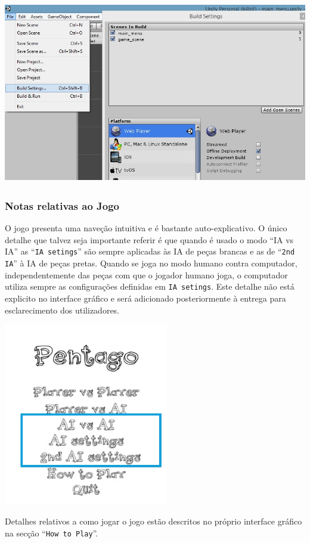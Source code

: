 \begin{table}[H]
\centering
\includegraphics[height=8cm]{user_manual/unitybuild.jpg}
\end{table}

\newpage
\subsubsection{Notas relativas ao Jogo}

O jogo presenta uma naveç\~ao intuitiva e é bastante auto-explicativo. O único detalhe que talvez seja importante referir é que quando é usado o modo ``IA vs IA'' as ``\verb|IA setings|'' são sempre aplicadas às IA de peças brancas e as de ``\verb|2nd IA|'' à IA de peças pretas. Quando se joga no modo humano contra computador, independentemente das peças com que o jogador humano joga, o computador utiliza sempre as configurações definidas em \verb|IA setings|. Este detalhe n\~ao está explicito no interface gráfico e será adicionado posteriormente à entrega para esclarecimento dos utilizadores.

\begin{table}[H]
\centering
\includegraphics[height=8cm]{user_manual/iasettings.jpg}
\end{table}

Detalhes relativos a como jogar o jogo est\~ao descritos no próprio interface gráfico na secç\~ao ``\verb|How to Play|''.

